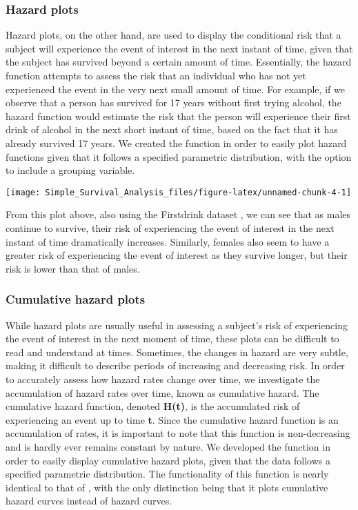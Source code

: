 \hypertarget{hazard-plots}{%
\subsubsection{Hazard plots}\label{hazard-plots}}

Hazard plots, on the other hand, are used to display the conditional
risk that a subject will experience the event of interest in the next
instant of time, given that the subject has survived beyond a certain
amount of time. Essentially, the hazard function attempts to assess the
risk that an individual who has not yet experienced the event in the
very next small amount of time. For example, if we observe that a person
has survived for 17 years without first trying alcohol, the hazard
function would estimate the risk that the person will experience their
first drink of alcohol in the next short instant of time, based on the
fact that it has already survived 17 years. We created the
 function in order to easily plot hazard functions given
that it follows a specified parametric distribution, with the option to
include a grouping variable.

\begin{Schunk}

\texttt{[image: Simple\_Survival\_Analysis\_files/figure-latex/unnamed-chunk-4-1]} \end{Schunk}

From this plot above, also using the Firstdrink dataset , we can see
that as males continue to survive, their risk of experiencing the event
of interest in the next instant of time dramatically increases.
Similarly, females also seem to have a greater risk of experiencing the
event of interest as they survive longer, but their risk is lower than
that of males.

\hypertarget{cumulative-hazard-plots}{%
\subsubsection{Cumulative hazard plots}\label{cumulative-hazard-plots}}

While hazard plots are usually useful in assessing a subject's risk of
experiencing the event of interest in the next moment of time, these
plots can be difficult to read and understand at times. Sometimes, the
changes in hazard are very subtle, making it difficult to describe
periods of increasing and decreasing risk. In order to accurately assess
how hazard rates change over time, we investigate the accumulation of
hazard rates over time, known as cumulative hazard. The cumulative
hazard function, denoted \textbf{H(t)}, is the accumulated risk of
experiencing an event up to time \textbf{t}. Since the cumulative hazard
function is an accumulation of rates, it is important to note that this
function is non-decreasing and is hardly ever remains constant by
nature. We developed the function  in order to easily
display cumulative hazard plots, given that the data follows a specified
parametric distribution. The functionality of this function is nearly
identical to that of , with the only distinction being
that it plots cumulative hazard curves instead of hazard curves.

